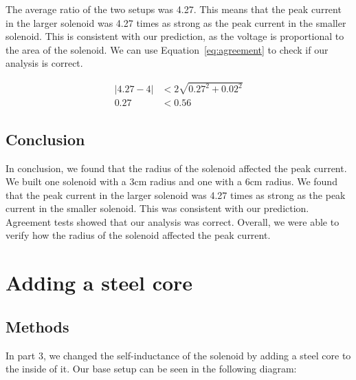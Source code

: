 \documentclass[11pt]{article}
\let\oldsection\section
\renewcommand\section{\clearpage\oldsection}
\begin{document}
    The average ratio of the two setups was 4.27.
    This means that the peak current in the larger solenoid was 4.27 times as strong as the peak current in the smaller solenoid.
    This is consistent with our prediction, as the voltage is proportional to the area of the solenoid.
    We can use Equation~\ref{eq:agreement} to check if our analysis is correct.

    \begin{align*}
        |4.27 - 4| &< 2 \sqrt{0.27^2 + 0.02^2} \\
        0.27 &< 0.56
    \end{align*}

    \subsection{Conclusion}\label{subsec:part_2_conclusion}

    In conclusion, we found that the radius of the solenoid affected the peak current.
    We built one solenoid with a 3cm radius and one with a 6cm radius.
    We found that the peak current in the larger solenoid was 4.27 times as strong as the peak current in the smaller solenoid.
    This was consistent with our prediction.
    Agreement tests showed that our analysis was correct.
    Overall, we were able to verify how the radius of the solenoid affected the peak current.

    \section{Adding a steel core}\label{sec:part_3}
    \subsection{Methods}\label{subsec:part_3_methods}
    In part 3, we changed the self-inductance of the solenoid by adding a steel core to the inside of it. Our base setup can be seen in the following diagram:
\end{document}
